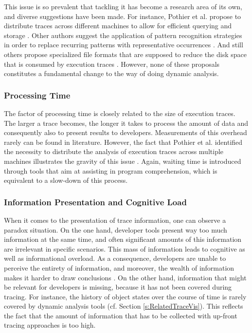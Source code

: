 This issue is so prevalent that tackling it has become a research area of its own, and diverse suggestions have been made.
For instance, Pothier et al. propose to distribute traces across different machines to allow for efficient querying and storage \cite{pothier_scalable_2007}.
Other authors suggest the application of pattern recognition strategies in order to  replace recurring patterns with representative occurrences \cite{de_pauw_execution_1998, systa_shimba_2001, richner_using_2002}.
And still others propose specialized file formats that are supposed to reduce the disk space that is consumed by execution traces \cite{johnson_lossless_1994, milenkovic_exploiting_2003}.
However, none of these proposals constitutes a fundamental change to the way of doing dynamic analysis.

\subsubsection{Processing Time}
The factor of processing time is closely related to the size of execution traces.
The larger a trace becomes, the longer it takes to process the amount of data and consequently also to present results to developers.
Measurements of this overhead rarely can be found in literature.
However, the fact that Pothier et al. identified the necessity to distribute the analysis of execution traces across multiple machines illustrates the gravity of this issue \cite{pothier_scalable_2007}.
Again, waiting time is introduced through tools that aim at assisting in program comprehension, which is equivalent to a slow-down of this process.

\subsubsection{Information Presentation and Cognitive Load}
When it comes to the presentation of trace information, one can observe a paradox situation.
On the one hand, developer tools present way too much information at the same time, and often significant amounts of this information are irrelevant in specific scenarios.
This mass of information leads to cognitive as well as informational overload.
As a consequence, developers are unable to perceive the entirety of information, and moreover, the wealth of information makes it harder to draw conclusions \cite{hiltz_structuring_1985, sheridan_man-machine_1981}.
On the other hand, information that might be relevant for developers is missing, because it has not been covered during tracing.
For instance, the history of object states over the course of time is rarely covered by dynamic analysis tools (cf. Section \ref{s:RelatedTraceVis}).
This reflects the fact that the amount of information that has to be collected with up-front tracing approaches is too high.

